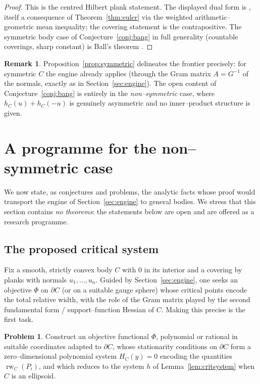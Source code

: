 \documentclass[11pt,reqno]{amsart}
\theoremstyle{plain}
\theoremstyle{definition}
\newtheorem{problem}[theorem]{Problem}
\newtheorem{remark}[theorem]{Remark}
\newcommand{\relw}{\operatorname{rw}}
\begin{document}
\begin{proof}
This is the centred Hilbert plank statement. The displayed dual form is
\cite[Cor.~6]{GalicerOrtegaPinasco2026}, itself a consequence of
Theorem~\ref{thm:euler} via the weighted arithmetic--geometric mean inequality;
the covering statement is the contrapositive. The symmetric body case of
Conjecture~\ref{conj:bang} in full generality (countable coverings, sharp constant)
is Ball's theorem \cite{Ball1991}.
\end{proof}

\begin{remark}
Proposition~\ref{prop:symmetric} delineates the frontier precisely: for symmetric
$C$ the engine already applies (through the Gram matrix $A=G^{-1}$ of the
normals, exactly as in Section~\ref{sec:engine}). The open content of
Conjecture~\ref{conj:bang} is entirely in the \emph{non--symmetric} case, where
$h_C(u)+h_C(-u)$ is genuinely asymmetric and no inner--product structure is given.
\end{remark}

\section{A programme for the non--symmetric case}\label{sec:programme}

We now state, as conjectures and problems, the analytic facts whose proof would
transport the engine of Section~\ref{sec:engine} to general bodies. We stress that
this section contains \emph{no theorems}: the statements below are open and are
offered as a research programme.

\subsection{The proposed critical system}
Fix a smooth, strictly convex body $C$ with $0$ in its interior and a covering by
planks with normals $u_1,\dots,u_n$. Guided by Section~\ref{sec:engine}, one seeks
an objective $\Phi$ on $\partial C$ (or on a suitable gauge sphere) whose critical
points encode the total relative width, with the role of the Gram matrix played by
the second fundamental form / support--function Hessian of $C$. Making this precise
is the first task.

\begin{problem}\label{prob:objective}
Construct an objective functional $\Phi$, polynomial or rational in suitable
coordinates adapted to $\partial C$, whose stationarity conditions on
$\partial C$ form a zero--dimensional polynomial system $H_C(y)=0$ encoding the
quantities $\relw_C(P_i)$, and which reduces to the system $h$ of
Lemma~\ref{lem:critsystem} when $C$ is an ellipsoid.
\end{problem}
\end{document}

